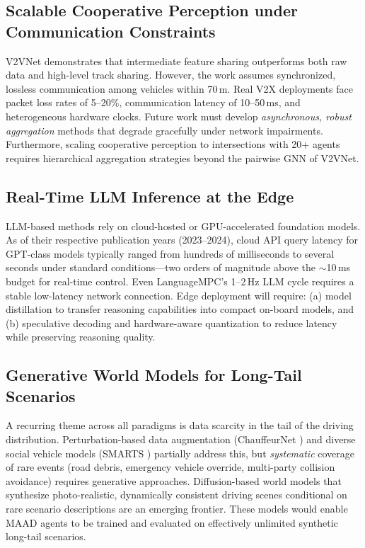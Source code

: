 \documentclass[12pt, a4paper]{article}
\begin{document}
\subsection{Scalable Cooperative Perception under Communication Constraints}
\label{sec:coop}

V2VNet \citep{wang2020v2vnet} demonstrates that intermediate feature sharing
outperforms both raw data and high-level track sharing. However, the work assumes
synchronized, lossless communication among vehicles within 70\,m. Real V2X
deployments face packet loss rates of 5--20\%, communication latency of 10--50\,ms,
and heterogeneous hardware clocks. Future work must develop \emph{asynchronous,
robust aggregation} methods that degrade gracefully under network impairments.
Furthermore, scaling cooperative perception to intersections with 20+ agents
requires hierarchical aggregation strategies beyond the pairwise GNN of V2VNet.

\subsection{Real-Time LLM Inference at the Edge}
\label{sec:latency}

LLM-based methods \citep{fu2023drive, wen2023dilu, mao2023gpt, sha2023languagempc}
rely on cloud-hosted or GPU-accelerated foundation models. As of their respective
publication years (2023--2024), cloud API query latency for GPT-class models
typically ranged from hundreds of milliseconds to several seconds under standard
conditions---two orders of magnitude above the $\sim$10\,ms budget for real-time
control. Even LanguageMPC's 1--2\,Hz LLM cycle requires a stable low-latency
network connection. Edge deployment will
require: (a) model distillation \citep{kiran2021deep} to transfer reasoning
capabilities into compact on-board models, and (b) speculative decoding and
hardware-aware quantization to reduce latency while preserving reasoning quality.

\subsection{Generative World Models for Long-Tail Scenarios}
\label{sec:worldmodel}

A recurring theme across all paradigms is data scarcity in the tail of the driving
distribution. Perturbation-based data augmentation (ChauffeurNet \citep{bansal2018chauffeur})
and diverse social vehicle models (SMARTS \citep{zhou2020smarts}) partially address
this, but \emph{systematic} coverage of rare events (road debris, emergency vehicle
override, multi-party collision avoidance) requires generative approaches.
Diffusion-based world models that synthesize photo-realistic, dynamically
consistent driving scenes conditional on rare scenario descriptions are an
emerging frontier. These models would enable MAAD agents to be trained and evaluated
on effectively unlimited synthetic long-tail scenarios.
\end{document}

